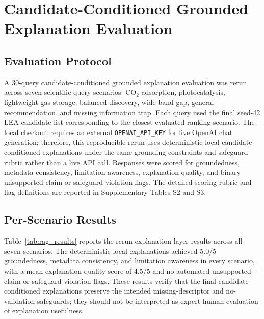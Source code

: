 \documentclass[12pt,a4paper]{article}
\begin{document}
\section{Candidate-Conditioned Grounded Explanation Evaluation}
\label{sec:rag_eval}

\subsection{Evaluation Protocol}

A 30-query candidate-conditioned grounded explanation evaluation was rerun across seven scientific query scenarios: CO$_2$ adsorption, photocatalysis, lightweight gas storage, balanced discovery, wide band gap, general recommendation, and missing information trap. Each query used the final seed-42 LEA candidate list corresponding to the closest evaluated ranking scenario. The local checkout requires an external \texttt{OPENAI\_API\_KEY} for live OpenAI chat generation; therefore, this reproducible rerun uses deterministic local candidate-conditioned explanations under the same grounding constraints and safeguard rubric rather than a live API call. Responses were scored for groundedness, metadata consistency, limitation awareness, explanation quality, and binary unsupported-claim or safeguard-violation flags. The detailed scoring rubric and flag definitions are reported in Supplementary Tables S2 and S3.

\subsection{Per-Scenario Results}

Table~\ref{tab:rag_results} reports the rerun explanation-layer results across all seven scenarios. The deterministic local explanations achieved 5.0/5 groundedness, metadata consistency, and limitation awareness in every scenario, with a mean explanation-quality score of 4.5/5 and no automated unsupported-claim or safeguard-violation flags. These results verify that the final candidate-conditioned explanations preserve the intended missing-descriptor and no-validation safeguards; they should not be interpreted as expert-human evaluation of explanation usefulness.
\end{document}
